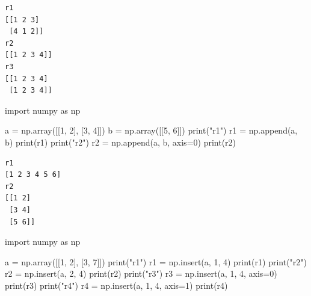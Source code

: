\documentclass[
  letterpaper,
  DIV=11,
  numbers=noendperiod]{scrreprt}
\newenvironment{Shaded}{\begin{snugshade}}{\end{snugshade}}
\newcommand{\BuiltInTok}[1]{\textcolor[rgb]{0.00,0.23,0.31}{#1}}
\newcommand{\DecValTok}[1]{\textcolor[rgb]{0.68,0.00,0.00}{#1}}
\newcommand{\ImportTok}[1]{\textcolor[rgb]{0.00,0.46,0.62}{#1}}
\newcommand{\NormalTok}[1]{\textcolor[rgb]{0.00,0.23,0.31}{#1}}
\newcommand{\OperatorTok}[1]{\textcolor[rgb]{0.37,0.37,0.37}{#1}}
\newcommand{\StringTok}[1]{\textcolor[rgb]{0.13,0.47,0.30}{#1}}
\begin{document}
\begin{verbatim}
r1
[[1 2 3]
 [4 1 2]]
r2
[[1 2 3 4]]
r3
[[1 2 3 4]
 [1 2 3 4]]
\end{verbatim}

\begin{Shaded}
\begin{Highlighting}[]
\ImportTok{import}\NormalTok{ numpy }\ImportTok{as}\NormalTok{ np}

\NormalTok{a }\OperatorTok{=}\NormalTok{ np.array([[}\DecValTok{1}\NormalTok{, }\DecValTok{2}\NormalTok{], [}\DecValTok{3}\NormalTok{, }\DecValTok{4}\NormalTok{]])}
\NormalTok{b }\OperatorTok{=}\NormalTok{ np.array([[}\DecValTok{5}\NormalTok{, }\DecValTok{6}\NormalTok{]])}
\BuiltInTok{print}\NormalTok{(}\StringTok{"r1"}\NormalTok{)}
\NormalTok{r1 }\OperatorTok{=}\NormalTok{ np.append(a, b)}
\BuiltInTok{print}\NormalTok{(r1)}
\BuiltInTok{print}\NormalTok{(}\StringTok{"r2"}\NormalTok{)}
\NormalTok{r2 }\OperatorTok{=}\NormalTok{ np.append(a, b, axis}\OperatorTok{=}\DecValTok{0}\NormalTok{)}
\BuiltInTok{print}\NormalTok{(r2)}
\end{Highlighting}
\end{Shaded}

\begin{verbatim}
r1
[1 2 3 4 5 6]
r2
[[1 2]
 [3 4]
 [5 6]]
\end{verbatim}

\begin{Shaded}
\begin{Highlighting}[]
\ImportTok{import}\NormalTok{ numpy }\ImportTok{as}\NormalTok{ np}

\NormalTok{a }\OperatorTok{=}\NormalTok{ np.array([[}\DecValTok{1}\NormalTok{, }\DecValTok{2}\NormalTok{], [}\DecValTok{3}\NormalTok{, }\DecValTok{7}\NormalTok{]])}
\BuiltInTok{print}\NormalTok{(}\StringTok{"r1"}\NormalTok{)}
\NormalTok{r1 }\OperatorTok{=}\NormalTok{ np.insert(a, }\DecValTok{1}\NormalTok{, }\DecValTok{4}\NormalTok{)}
\BuiltInTok{print}\NormalTok{(r1)}
\BuiltInTok{print}\NormalTok{(}\StringTok{"r2"}\NormalTok{)}
\NormalTok{r2 }\OperatorTok{=}\NormalTok{ np.insert(a, }\DecValTok{2}\NormalTok{, }\DecValTok{4}\NormalTok{)}
\BuiltInTok{print}\NormalTok{(r2)}
\BuiltInTok{print}\NormalTok{(}\StringTok{"r3"}\NormalTok{)}
\NormalTok{r3 }\OperatorTok{=}\NormalTok{ np.insert(a, }\DecValTok{1}\NormalTok{, }\DecValTok{4}\NormalTok{, axis}\OperatorTok{=}\DecValTok{0}\NormalTok{)}
\BuiltInTok{print}\NormalTok{(r3)}
\BuiltInTok{print}\NormalTok{(}\StringTok{"r4"}\NormalTok{)}
\NormalTok{r4 }\OperatorTok{=}\NormalTok{ np.insert(a, }\DecValTok{1}\NormalTok{, }\DecValTok{4}\NormalTok{, axis}\OperatorTok{=}\DecValTok{1}\NormalTok{)}
\BuiltInTok{print}\NormalTok{(r4)}
\end{Highlighting}
\end{Shaded}
\end{document}
